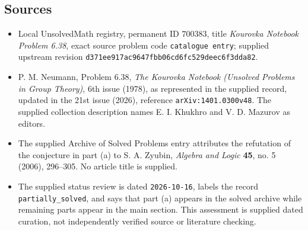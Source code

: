 \documentclass[11pt]{article}
\begin{document}
\subsection{Sources}
\begin{itemize}
\item Local UnsolvedMath registry, permanent ID \(700383\), title \emph{Kourovka Notebook Problem 6.38}, exact source problem code \texttt{catalogue entry}; supplied upstream revision \texttt{d371ee917ac9647fbb06cd6fc529deec6f3dda82}.
\item P. M. Neumann, Problem 6.38, \emph{The Kourovka Notebook (Unsolved Problems in Group Theory)}, 6th issue (1978), as represented in the supplied record, updated in the 21st issue (2026), reference \texttt{arXiv:1401.0300v48}. The supplied collection description names E. I. Khukhro and V. D. Mazurov as editors.
\item The supplied Archive of Solved Problems entry attributes the refutation of the conjecture in part (a) to S. A. Zyubin, \emph{Algebra and Logic} \textbf{45}, no. 5 (2006), 296--305. No article title is supplied.
\item The supplied status review is dated \texttt{2026-10-16}, labels the record \texttt{partially\_solved}, and says that part (a) appears in the solved archive while remaining parts appear in the main section. This assessment is supplied dated curation, not independently verified source or literature checking.
\end{itemize}
\end{document}
